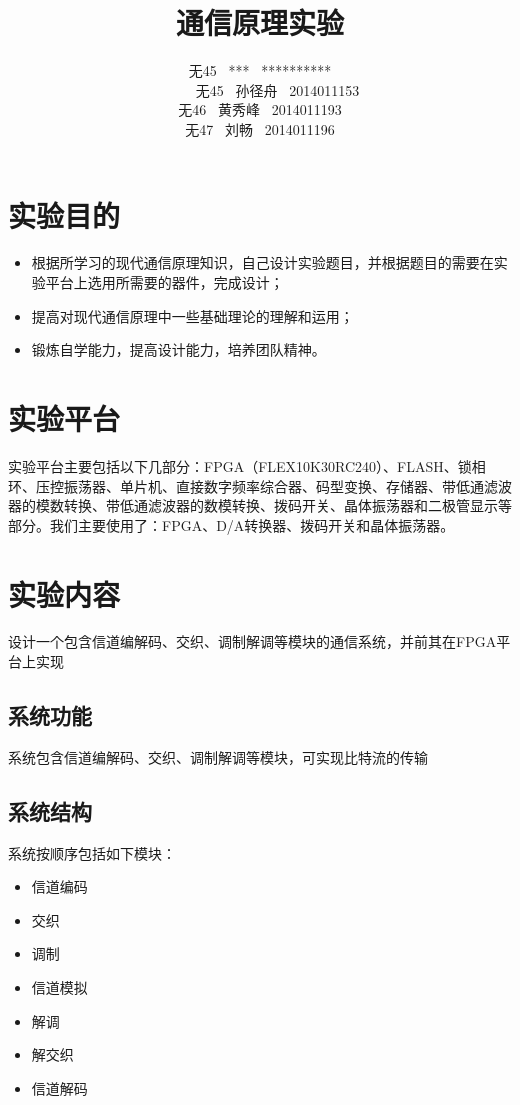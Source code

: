 \documentclass[UTF8]{ctexart}
\date{}
\title{\textbf{通信原理实验}}
\author{无45 \ *** \ **********\\
        无45 \ 孙径舟 \ 2014011153\\
        无46 \ 黄秀峰 \ 2014011193\\
        无47 \ 刘畅 \ 2014011196}
\begin{document}
\maketitle

\section{实验目的}

\begin{itemize}

\item 根据所学习的现代通信原理知识，自己设计实验题目，并根据题目的需要在实验平台上选用所需要的器件，完成设计；
\item 提高对现代通信原理中一些基础理论的理解和运用；
\item 锻炼自学能力，提高设计能力，培养团队精神。

\end{itemize}

\section{实验平台}

实验平台主要包括以下几部分：FPGA（FLEX10K30RC240）、FLASH、锁相环、压控振荡器、单片机、直接数字频率综合器、码型变换、存储器、带低通滤波器的模数转换、带低通滤波器的数模转换、拨码开关、晶体振荡器和二极管显示等部分。我们主要使用了：FPGA、D/A转换器、拨码开关和晶体振荡器。

\section{实验内容}

设计一个包含信道编解码、交织、调制解调等模块的通信系统，并前其在FPGA平台上实现

\subsection{系统功能}

系统包含信道编解码、交织、调制解调等模块，可实现比特流的传输

\subsection{系统结构}

系统按顺序包括如下模块：

\begin{itemize}

\item 信道编码
\item 交织
\item 调制
\item 信道模拟
\item 解调
\item 解交织
\item 信道解码

\end{itemize}
\end{document}
